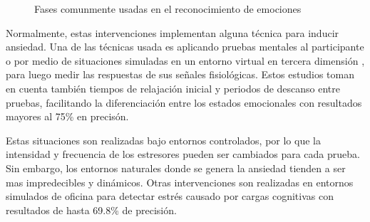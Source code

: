 \begin{figure}[h]
	\centering
	\caption{Fases comunmente usadas en el reconocimiento de emociones} \label{fig:anxiDetection}
\end{figure}

Normalmente, estas intervenciones implementan alguna t\'ecnica para inducir ansiedad. Una de las t\'ecnicas usada es aplicando pruebas mentales al participante \citep{rani2007anxiety} o por medio de situaciones simuladas en un entorno virtual en tercera dimensi\'on \citep{repetto2013}, \citep{Handouzi2014217} para luego medir las respuestas de sus se\~nales fisiol\'ogicas. Estos estudios toman en cuenta tambi\'en tiempos de relajaci\'on inicial y periodos de descanso entre pruebas, facilitando la diferenciaci\'on entre los estados emocionales con resultados mayores al 75\% en precis\'on.

Estas situaciones son realizadas bajo entornos controlados, por lo que la intensidad y frecuencia de los estresores pueden ser cambiados para cada prueba. Sin embargo, los entornos naturales donde se genera la ansiedad tienden a ser mas impredecibles y din\'amicos. Otras intervenciones son realizadas en entornos simulados de oficina para detectar estr\'es causado por cargas cognitivas \citep{Cinaz13} con resultados de hasta 69.8\% de precisi\'on.

